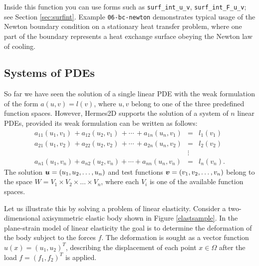 Inside this function you can use forms such as \verb"surf_int_u_v", \verb"surf_int_F_u_v"; see
Section \ref{sec:surfint}. Example {\tt 06-bc-newton} demonstrates typical usage of the Newton
boundary condition on a stationary heat transfer problem, where one part of the boundary 
represents a heat exchange surface obeying the Newton law of cooling.




\subsection{Systems of PDEs}
\label{sec:systems}


So far we have seen the solution of a single linear PDE with the weak formulation
of the form $a(u,v) = l(v)$, where $u, v$ belong to one of the three predefined
function spaces. However, Hermes2D supports the solution of a system of $n$ linear
PDEs, provided its weak formulation can be written as follows:
\begin{eqnarray}
  a_{11}(u_1,v_1)\,+ a_{12}(u_2,v_1)\,+ \cdots\,+ a_{1n}(u_n,v_1) &=& l_1(v_1) \nonumber \\
  a_{21}(u_1,v_2)\,+ a_{22}(u_2,v_2)\,+ \cdots\,+ a_{2n}(u_n,v_2) &=& l_2(v_2) \label{weaksystem} \\
                                                      &\vdots&     \nonumber  \\
  a_{n1}(u_1,v_n) + a_{n2}(u_2,v_n) + \cdots + a_{nn}(u_n,v_n) &=& l_n(v_n). \nonumber
\end{eqnarray}
The solution $\mbox{\boldmath $u$} = (u_1, u_2, \dots, u_n)$ and test functions $\mbox{\boldmath $v$} =
(v_1, v_2, \dots, v_n)$ belong to the space $W = V_1 \times V_2 \times \dots
\times V_n$, where each $V_i$ is one of the available function spaces.

Let us illustrate this by solving a problem of linear elasticity. Consider a
two-dimensional axisymmetric elastic body shown in Figure \ref{elastsample}.
In the plane-strain model of linear elasticity the goal is to determine the
deformation of the body subject to the forces $f$. The deformation is sought
as a vector function $u(x) = (u_1, u_2)^T$, describing the displacement of each point
$x \in \Omega$ after the load $f = (f_1, f_2)^T$ is applied.

